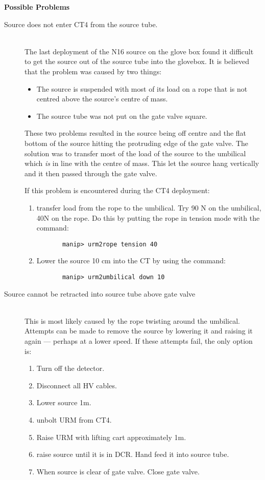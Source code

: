 \newpage
\vspace*{0.2in}
\noindent
{\bf Possible Problems}
\begin{description}
\item[Source does not enter CT4 from the source tube.]~\\
  The last deployment of the N16 source on the glove box found
it difficult to get the source out of the source tube into the
glovebox.  It is believed that the problem was caused by two
things:
\begin{itemize}
\item The source is suspended with most of its load on a rope
  that is not centred above the source's centre of mass.
\item The source tube was not put on the gate valve square.
\end{itemize}
These two problems resulted in the source being off centre and
the flat bottom of the source hitting the protruding edge of the
gate valve.  
  The solution was to transfer most of the load of the source to
the umbilical which {\em is} in line with the centre of mass.
This let the source hang vertically and it then passed through
the gate valve.
  
If this problem is encountered during the CT4 deployment:
\begin{enumerate}
\item transfer load from the rope to the umbilical.  Try 90 N on
  the umbilical, 40N on the rope.  Do this by putting the rope
  in tension mode with the command:
  \begin{verbatim}
       manip> urm2rope tension 40
  \end{verbatim}
\item Lower the source 10 cm into the CT by using the command:
  \begin{verbatim}
       manip> urm2umbilical down 10
  \end{verbatim}
\end{enumerate}  

\item[Source cannot be retracted into source tube above gate valve]~\\
  This is most likely caused by the rope twisting around the umbilical.
  Attempts can be made to remove the source by lowering it and raising
  it again --- perhaps at a lower speed.  If these attempts fail, the
  only option is:
  \begin{enumerate}
  \item Turn off the detector.
  \item Disconnect all HV cables.
  \item Lower source 1m.
  \item unbolt URM from CT4.
  \item Raise URM with lifting cart approximately 1m.
  \item raise source until it is in DCR.  Hand feed it into
        source tube.
  \item When source is clear of gate valve.  Close gate valve.
  \end{enumerate}
  



\end{description}




